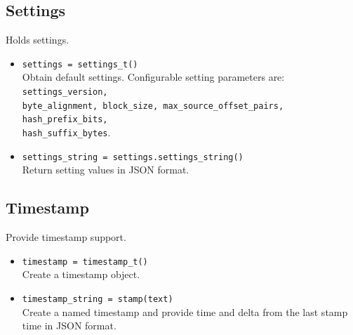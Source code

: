 \documentclass[11pt,fleqn]{article} %
\begin{document}
\subsection{Settings}
Holds \hdb settings.

\begin{itemize}
\item \verb+settings = settings_t()+\\
Obtain default settings. Configurable setting parameters are: \verb+settings_version,+\\
\verb+byte_alignment, block_size, max_source_offset_pairs, hash_prefix_bits,+\\
\verb+hash_suffix_bytes+.
\item \verb+settings_string = settings.settings_string()+\\
Return setting values in JSON format.
\end{itemize}

\subsection{Timestamp}
Provide timestamp support.

\begin{itemize}
\item \verb+timestamp = timestamp_t()+\\
Create a timestamp object.
\item \verb+timestamp_string = stamp(text)+\\
Create a named timestamp and provide time and delta from the last stamp time in JSON format.
\end{itemize}
\end{document}
